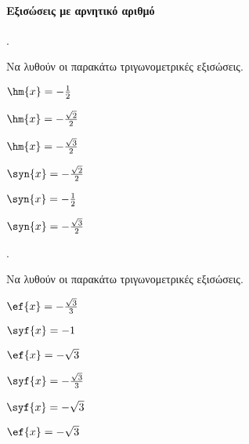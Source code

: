 \documentclass[11pt,a4paper,twocolumn]{article}
\newcounter{askhsh}
\newcommand{\askhsh}{\large\theaskhsh.\ \addtocounter{askhsh}{1}}
\begin{document}
\paragraph{Εξισώσεις με αρνητικό αριθμό}
\askhsh 
Να λυθούν οι παρακάτω τριγωνομετρικές εξισώσεις.
\begin{multicols}{2}
\begin{alist}
\item $ \hm{x}=-\frac{1}{2} $
\item $ \hm{x}=-\frac{\sqrt{2}}{2} $
\item $ \hm{x}=-\frac{\sqrt{3}}{2} $
\item $ \syn{x}=-\frac{\sqrt{2}}{2} $
\item $ \syn{x}=-\frac{1}{2} $
\item $ \syn{x}=-\frac{\sqrt{3}}{2} $
\end{alist}
\end{multicols}
\askhsh 
Να λυθούν οι παρακάτω τριγωνομετρικές εξισώσεις.
\begin{multicols}{2}
\begin{alist}
\item $ \ef{x}=-\frac{\sqrt{3}}{3} $
\item $ \syf{x}=-1 $
\item $ \ef{x}=-\sqrt{3} $
\item $ \syf{x}=-\frac{\sqrt{3}}{3} $
\item $ \syf{x}=-\sqrt{3} $
\item $ \ef{x}=-\sqrt{3} $
\end{alist}
\end{multicols}
\end{document}
